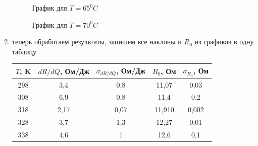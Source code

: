 \documentclass[a4paper, 12pt]{article}%
\begin{document}
\begin{enumerate}
\begin{figure}[h]
\caption{График для $T = 65 ^0 C$}
\end{figure}
\FloatBarrier
\FloatBarrier
\begin{figure}[h]
\caption{График для $T = 70 ^0 C$}
\end{figure}
\FloatBarrier
\item теперь обработаем результаты, запишем все наклоны и $R_0$ из графиков в одну таблицу
\begin{table}[h]
\begin{tabular}{|c|c|c|c|c|}
\hline
$T$, K & $dR/dQ$, Ом/Дж & $\sigma_{dR/dQ}$,  Ом/Дж & $R_0$, Ом & $\sigma_{R_0}$, Ом \\ \hline
298 & 3,4 & 0,8 & 11,07 & 0,03 \\ \hline
308 & 6,9 & 0,8 & 11,4 & 0,2 \\ \hline
318 & 2,17 & 0,07 & 11,910 & 0,002 \\ \hline
328 & 3,7 & 1,3 & 12,27 & 0,01 \\ \hline
338 & 4,6 & 1 & 12,6 & 0,1 \\ \hline
\end{tabular}
\end{table}
\FloatBarrier
\begin{figure}[h]

\end{figure}
\end{enumerate}
\end{document}
